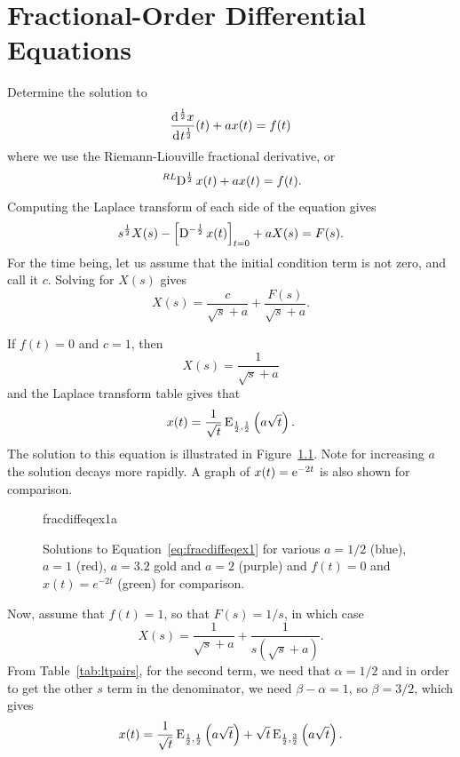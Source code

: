 \chapter{Fractional-Order Differential Equations}
\label{ch:diffeq}

\begin{example}
  Determine the solution to
  \begin{equation*}
    \frac{\operatorname{d}\hspace*{-1pt}^{\frac{1}{2}}x}{\operatorname{d}\hspace*{-1pt} t^{\frac{1}{2}}}(t) + a x(t) = f(t)
  \end{equation*}
  where we use the Riemann-Liouville fractional derivative, or
  \begin{equation}
    \tensor*[^{RL}]{\D}{^{\frac{1}{2}}} x(t) + a x(t) = f(t).
    \label{eq:fracdiffeqex1}
  \end{equation}
Computing the Laplace transform of each side of the equation gives
\begin{equation*}
  s^\frac{1}{2} X(s) - \left[ \tensor*[]{\D}{^{-\frac{1}{2}}} x(t) \right]_{t=0} + a X(s) = F(s).
\end{equation*}
For the time being, let us assume that the initial condition term is not zero, and call it $c$. Solving for $X(s)$ gives
\begin{equation*}
  X(s) = \frac{c}{\sqrt{s} + a} + \frac{F(s)}{\sqrt{s} + a}.
\end{equation*}

If $f(t) = 0$ and $c = 1$, then
\begin{equation*}
  X(s) = \frac{1}{\sqrt{s}+a}
\end{equation*}
and the Laplace transform table gives that 
\begin{equation*}
  x(t) = \frac{1}{\sqrt{t}} \operatorname{E}_{\frac{1}{2},\frac{1}{2}}\left( a \sqrt{t} \right). 
\end{equation*}
The solution to this equation is illustrated in Figure~\ref{fig:fracdiffeqex1a}. Note for increasing $a$ the solution decays more rapidly. A graph of $x(t) = \operatorname{e}^{-2 t}$ is also shown for comparison.

\begin{figure}
  \centering
  {fracdiffeqex1a}
  \caption{Solutions to Equation~\ref{eq:fracdiffeqex1} for various $a = 1/2$ (blue), $a=1$ (red), $a=3.2$ gold and $a=2$ (purple) and $f(t)=0$ and $x(t) = e^{-2 t}$ (green) for comparison.}
  \label{fig:fracdiffeqex1a}
\end{figure}

Now, assume that $f(t) = 1$, so that $F(s) = 1/s$, in which case
\begin{equation}
  X(s) = \frac{1}{\sqrt{s} + a} + \frac{1}{s \left( \sqrt{s} + a \right)}.
\end{equation}
From Table~\ref{tab:ltpairs}, for the second term, we need that $\alpha = 1/2$ and in order to get the other $s$ term in the denominator, we need $\beta - \alpha = 1$, so $\beta = 3/2$, which gives
\begin{equation*}
  x(t) = \frac{1}{\sqrt{t}} \operatorname{E}_{\frac{1}{2},\frac{1}{2}} \left( a \sqrt{t} \right) + \sqrt{t} \operatorname{E}_{\frac{1}{2},\frac{3}{2}} \left( a \sqrt{t} \right).
\end{equation*}


\end{example}
